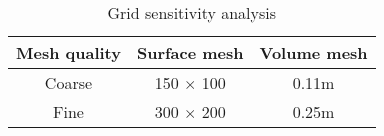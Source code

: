 \begin{table}[!htbp]
    \centering
    \begin{tabular}{|c|c|c|}\hline
        \textbf{Mesh quality} & \textbf{Surface mesh} & \textbf{Volume mesh} \\\hline
        Coarse  & 150 $\times$ 100 & 0.11m \\
        Fine  & 300 $\times$ 200 & 0.25m \\\hline
    \end{tabular}
    \caption{Grid sensitivity analysis}
    \label{grid_sensitivity}
\end{table}
